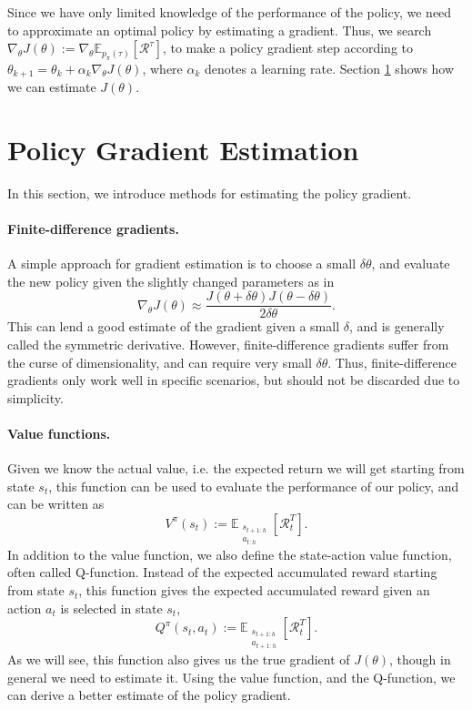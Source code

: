 Since we have only limited knowledge of the performance of the policy, we need to approximate an optimal policy by estimating a gradient. 
Thus, we search $\nabla_\theta J(\theta) := \nabla_\theta \mathbb{E}_{p_\pi(\tau)}\left[\mathcal{R}^\tau\right]$, to make a policy gradient step according to $\theta_{k+1} = \theta_k + \alpha_k \nabla_\theta J(\theta)$, where $\alpha_k$ denotes a learning rate. 
Section \ref{sec:pge} shows how we can estimate $J(\theta)$.

\section{Policy Gradient Estimation}
\label{sec:pge}

In this section, we introduce methods for estimating the policy gradient.

\paragraph{Finite-difference gradients.} 
A simple approach for gradient estimation is to choose a small $\delta\theta$, and evaluate the new policy given the slightly changed parameters as in 
\begin{equation}
	\nabla_\theta J(\theta) \approx \frac{J(\theta+\delta\theta)J(\theta-\delta\theta)}{2\delta\theta}.
\end{equation} 
This can lend a good estimate of the gradient given a small $\delta$, and is generally called the symmetric derivative. 
However, finite-difference gradients suffer from the curse of dimensionality, and can require very small $\delta\theta$.
Thus, finite-difference gradients only work well in specific scenarios, but should not be discarded due to simplicity.

\paragraph{Value functions.} 
Given we know the actual value, i.e. the expected return we will get starting from state $s_t$, this function can be used to evaluate the performance of our policy, and can be written as
\begin{equation}
	V^{\pi}(s_t) := \mathbb{E}_{\substack{s_{t+1:h} \\ a_{t:h}}}\left[\mathcal{R}_t^T\right].
	\label{eqn:v}
\end{equation}
In addition to the value function, we also define the state-action value function, often called Q-function. 
Instead of the expected accumulated reward starting from state $s_t$, this function gives the expected accumulated reward given an action $a_t$ is selected in state $s_t$, 
\begin{equation}
	Q^{\pi}(s_t, a_t) := \mathbb{E}_{\substack{s_{t+1:h} \\ a_{t+1:h}}}\left[\mathcal{R}_t^T\right].
	\label{eqn:q}
\end{equation}
As we will see, this function also gives us the true gradient of $J(\theta)$, though in general we need to estimate it. 
Using the value function, and the Q-function, we can derive a better estimate of the policy gradient.

